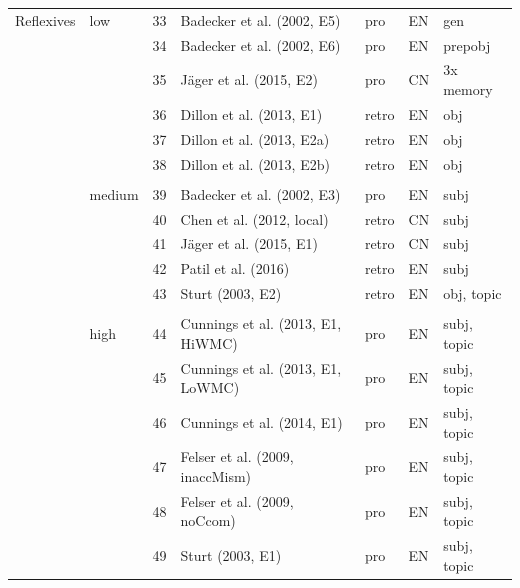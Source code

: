 \documentclass{cambridge7A}\usepackage[]{graphicx}\usepackage[]{color}
\begin{document}
\begin{subappendices}
\begin{table}[!htbp]
\centering
{\scriptsize
\begin{tabular}{llrllll}
Reflexives     & low      & 33    & Badecker et al. (2002, E5)          & pro     & EN   & gen \\
               &            & 34    & Badecker et al. (2002, E6)          & pro     & EN   & prepobj \\
               &            & 35    & J\"ager et al. (2015, E2)            & pro     & CN   & 3x memory \\
               &            & 36    & Dillon et al. (2013, E1)            & retro   & EN   & obj \\
               &            & 37    & Dillon et al. (2013, E2a)            & retro   & EN   & obj \\
               &            & 38    & Dillon et al. (2013, E2b)            & retro   & EN   & obj \\
&&&&&& \\
               & medium         & 39    & Badecker et al. (2002, E3)          & pro     & EN   & subj \\
               &            & 40    & Chen et al. (2012, local)           & retro   & CN   & subj \\
               &            & 41    & J\"ager et al. (2015, E1)            & retro   & CN   & subj \\
               &            & 42    & Patil et al. (2016)                 & retro   & EN   & subj \\
               &            & 43    & Sturt (2003, E2)                    & retro   & EN   & obj, topic \\
&&&&&& \\
               & high        & 44    & Cunnings et al. (2013, E1, HiWMC)   & pro     & EN   & subj, topic \\
               &            & 45    & Cunnings et al. (2013, E1, LoWMC)   & pro     & EN   & subj, topic \\
               &            & 46    & Cunnings et al. (2014, E1)          & pro     & EN   & subj, topic \\
               &            & 47    & Felser et al. (2009, inaccMism)     & pro     & EN   & subj, topic \\
               &            & 48    & Felser et al. (2009, noCcom)        & pro     & EN   & subj, topic \\
               &            & 49    & Sturt (2003, E1)                    & pro     & EN   & subj, topic \\

\end{tabular}}
\end{table}
\end{subappendices}
\end{document}
